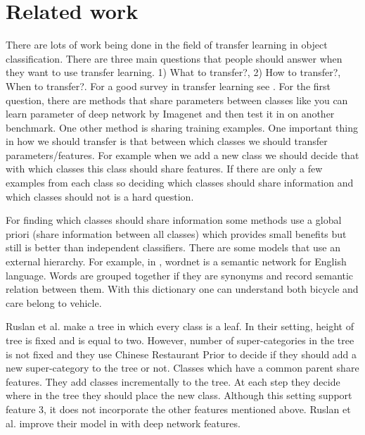 \documentclass[10pt,twocolumn,letterpaper]{article}
\begin{document}
\section{Related work}

There are lots of work being done in the field of transfer learning in object
classification. There are three main questions that people should answer when
they want to use transfer learning. 1) What to transfer?,  2) How to transfer?,
When to transfer?. For a good survey in transfer learning see
\cite{transfersurvey}. For the first question, there are methods that share
parameters between classes like you can learn parameter of deep network
\cite{deepnetwork} by Imagenet \cite{imagenet} and then test it in on another
benchmark. One other method is sharing training examples.  One important
thing in how we should transfer is that between which classes we should
transfer parameters/features. For example when we add a new class we
should decide that with which classes this class should share features.
If there are only a few examples from each class so deciding which
classes should share information and which classes should not is a hard
question.

For finding which classes should share information some methods use a global
priori \cite{priori} (share information between all classes) which provides
small benefits but still is better than independent classifiers. There are some
models \cite{semantic} that use an external hierarchy. For example, in
\cite{semantic}, wordnet \cite{wordnet} is a semantic network for English
language. Words are grouped together if they are synonyms and record semantic
relation between them. With this dictionary one can understand both bicycle and
care belong to vehicle.


Ruslan et al. \cite{ruslan} make a tree in which every class is a leaf. In
their setting, height of tree is fixed and is equal to two. However, number of
super-categories in the tree is not fixed and they use Chinese Restaurant Prior \cite{CRP} 
to decide if they should add
a new super-category to the tree or not. Classes which have a common parent share
features. They add classes incrementally to the tree. At each step they decide
where in the tree they should place the new class. Although this setting support
feature 3, it does not incorporate the other features mentioned above. 
Ruslan et al. improve  their model in \cite{ruslan2} with deep network features.
\end{document}
